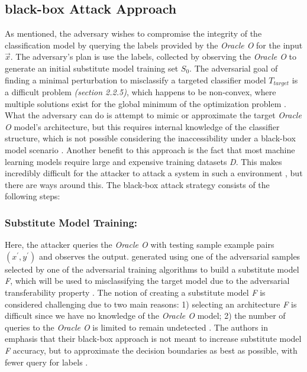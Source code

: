 \documentclass[grad,lot,lof,11pt,oneside,onehalfspace]{RUthesis}
\begin{document}
\subsection{black-box Attack Approach}
As mentioned, the adversary wishes to compromise the integrity of the classification model by querying the labels provided by the \textit{Oracle O} for the input $\vec{x}$. The adversary's plan is use the labels, collected by observing the \textit{Oracle O} to generate an initial substitute model training set \textit{$S_{0}$}. The adversarial goal of finding a minimal perturbation to misclassify a targeted classifier model \textit{$T_{target}$} is a difficult problem \textit{(section 2.2.5)}, which happens to be non-convex, where multiple solutions exist for the global minimum of the optimization problem \cite{papernot_practical_2017}. What the adversary can do is attempt to mimic  or approximate the target \textit{Oracle O} model's architecture, but this requires internal knowledge of the classifier structure, which is not possible considering the inaccessibility under a black-box model scenario \cite{papernot_practical_2017}. Another benefit to this approach is the fact that most machine learning models require large and expensive training datasets \textit{D}. This makes incredibly difficult for the attacker to attack a system in such a environment \cite{papernot_practical_2017}, but there are ways around this. The black-box attack strategy consists of the following steps:
\subsubsection{Substitute Model Training:} Here, the attacker queries the \textit{Oracle O} with testing sample example pairs $(x^{'},y^{'})$ and observes the output. generated using one of the adversarial samples selected by one of the adversarial training algorithms to build a substitute model \textit{F}, which will be used to misclassifying the target model due to the adversarial transferability property \cite{papernot_practical_2017}. The notion of creating a substitute model \textit{F} is considered challenging due to two main reasons: 1) selecting an architecture \textit{F} is difficult since we have no knowledge of the \textit{Oracle O} model; 2) the number of queries to the \textit{Oracle O} is limited to remain undetected \cite{papernot_practical_2017}. The authors in \cite{papernot_practical_2017} emphasis that their black-box approach is not meant to increase substitute model \textit{F} accuracy, but to approximate the decision boundaries as best as possible, with fewer query for labels \cite{papernot_practical_2017}. 
\end{document}
